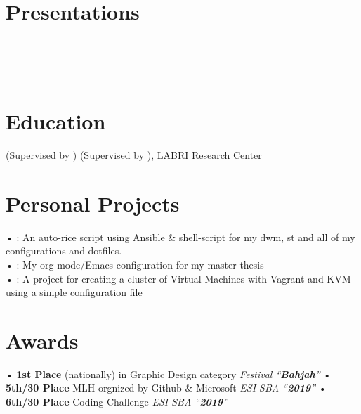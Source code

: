 \documentclass{cv}
\begin{document}

\section{Presentations}
\\
\\
\\

\section{Education}
{\footnotesize{(Supervised by \rhn)}}
{}
{\footnotesize{(Supervised by \rhn)}, \footnotesize{LABRI Research Center \urd}}
{}

\section{Personal Projects}
      • : An auto-rice script using Ansible \& shell-script for my dwm, st and all of my configurations and dotfiles.\\
      • : My org-mode/Emacs configuration for my master thesis\\
      • : A project for creating a cluster of Virtual Machines with Vagrant and KVM using a simple configuration file

\section{Awards}
  • \textbf{1st Place} (nationally) in  Graphic Design category \emph{Festival ``\textbf{Bahjah}''} 
  • \textbf{5th/30 Place} MLH orgnized by Github \& Microsoft \emph{ESI-SBA ``\textbf{2019}''} 
  • \textbf{6th/30 Place} Coding Challenge \emph{ESI-SBA ``\textbf{2019}''}
\end{document}
